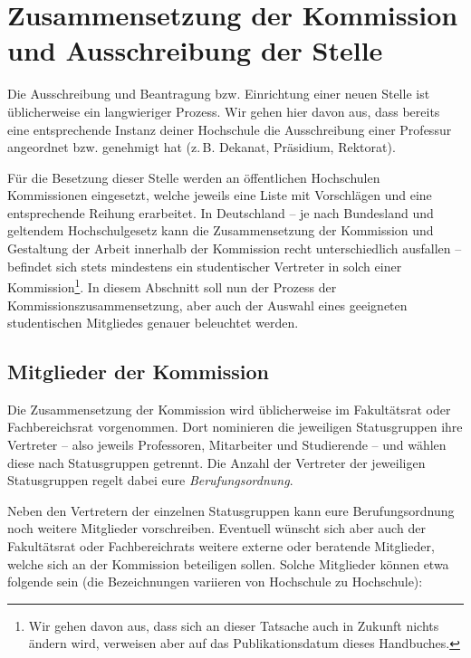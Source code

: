 \section[Zusammensetzung und Ausschreibung]{Zusammensetzung der Kommission und Ausschreibung der Stelle}
Die Ausschreibung und Beantragung bzw. Einrichtung einer neuen Stelle ist üblicherweise ein langwieriger Prozess. Wir gehen hier davon aus, dass bereits eine entsprechende Instanz deiner Hochschule die Ausschreibung einer Professur angeordnet bzw. genehmigt hat (z.\,B. Dekanat, Präsidium, Rektorat).

Für die Besetzung dieser Stelle werden an öffentlichen Hochschulen Kommissionen eingesetzt, welche jeweils eine Liste mit Vorschlägen und eine entsprechende Reihung erarbeitet. In Deutschland -- je nach Bundesland und geltendem Hochschulgesetz kann die Zusammensetzung der Kommission und Gestaltung der Arbeit innerhalb der Kommission recht unterschiedlich ausfallen -- befindet sich stets mindestens ein studentischer Vertreter in solch einer Kommission\footnote{Wir gehen davon aus, dass sich an dieser Tatsache auch in Zukunft nichts ändern wird, verweisen aber auf das Publikationsdatum dieses Handbuches.}. In diesem Abschnitt soll nun der Prozess der Kommissionszusammensetzung, aber auch der Auswahl eines geeigneten studentischen Mitgliedes genauer beleuchtet werden.

\subsection{Mitglieder der Kommission}
Die Zusammensetzung der Kommission wird üblicherweise im Fakultätsrat oder Fachbereichsrat vorgenommen. Dort nominieren die jeweiligen Statusgruppen ihre Vertreter -- also jeweils Professoren, Mitarbeiter und Studierende -- und wählen diese nach Statusgruppen getrennt. Die Anzahl der Vertreter der jeweiligen Statusgruppen regelt dabei eure \emph{Berufungsordnung}.

Neben den Vertretern der einzelnen Statusgruppen kann eure Berufungsordnung noch weitere Mitglieder vorschreiben. Eventuell wünscht sich aber auch der Fakultätsrat oder Fachbereichrats weitere externe oder beratende Mitglieder, welche sich an der Kommission beteiligen sollen. Solche Mitglieder können etwa folgende sein (die Bezeichnungen variieren von Hochschule zu Hochschule):

